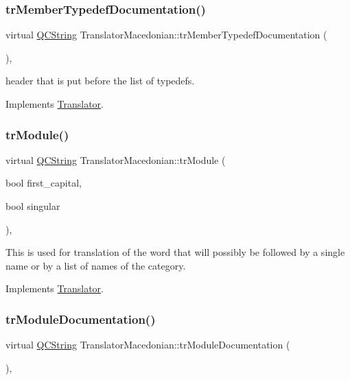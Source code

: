 \subsubsection{\texorpdfstring{trMemberTypedefDocumentation()}{trMemberTypedefDocumentation()}}
{\footnotesize\ttfamily virtual \mbox{\hyperlink{class_q_c_string}{Q\+C\+String}} Translator\+Macedonian\+::tr\+Member\+Typedef\+Documentation (\begin{DoxyParamCaption}{ }\end{DoxyParamCaption})\hspace{0.3cm}{\ttfamily [inline]}, {\ttfamily [virtual]}}

header that is put before the list of typedefs. 

Implements \mbox{\hyperlink{class_translator}{Translator}}.

\mbox{\label{class_translator_macedonian_ab96b77af3f361c0ec706e596ef0e6638}} 
\subsubsection{\texorpdfstring{trModule()}{trModule()}}
{\footnotesize\ttfamily virtual \mbox{\hyperlink{class_q_c_string}{Q\+C\+String}} Translator\+Macedonian\+::tr\+Module (\begin{DoxyParamCaption}\item[{bool}]{first\+\_\+capital,  }\item[{bool}]{singular }\end{DoxyParamCaption})\hspace{0.3cm}{\ttfamily [inline]}, {\ttfamily [virtual]}}

This is used for translation of the word that will possibly be followed by a single name or by a list of names of the category. 

Implements \mbox{\hyperlink{class_translator}{Translator}}.

\mbox{\label{class_translator_macedonian_a5663b813b92f64605b9350d383aa91f0}} 
\subsubsection{\texorpdfstring{trModuleDocumentation()}{trModuleDocumentation()}}
{\footnotesize\ttfamily virtual \mbox{\hyperlink{class_q_c_string}{Q\+C\+String}} Translator\+Macedonian\+::tr\+Module\+Documentation (\begin{DoxyParamCaption}{ }\end{DoxyParamCaption})\hspace{0.3cm}{\ttfamily [inline]}, {\ttfamily [virtual]}}

